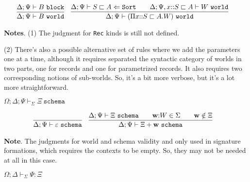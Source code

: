 \documentclass[letterpaper, 11pt]{article}
\newcommand{\Lar}{\Leftarrow}
\newcommand{\Rec}{\texttt{Rec}}
\newcommand{\Sort}{\texttt{Sort}}
\newcommand{\block}{\texttt{block}}
\newcommand{\world}{\texttt{world}}
\newcommand{\schema}{\texttt{schema}}
\begin{document}
    \begin{align*}
      & \infer{\Delta; \Psi \vdash B \ \world}{\Delta; \Psi \vdash B \ \block} &
      & \infer{\Delta; \Psi \vdash (\Pi x{::}S \sqsubset A. W) \ \world}
              {
                \Delta; \Psi \vdash S \sqsubset A \Lar \Sort
                &&
                \Delta; \Psi, x{::} S \sqsubset A \vdash W \ \world
              }
    \end{align*}

    

    \textbf{Notes}. (1) The judgment for \texttt{Rec} kinds is still not defined.
    
    (2) There's also a possible alternative set of rules where we add the parameters one at a time, although it requires separated the syntactic
    category of worlds in two parts, one for records and one for parametrized records.  It also requires two corresponding notions of sub-worlds.
    So, it's a bit more verbose, but it's a lot more straightforward.

    $\boxed{\Omega; \Delta; \Psi \vdash_\Sigma \Xi \ \schema}$

    \begin{align*}
      & \infer{\Delta; \Psi \vdash \varepsilon \ \schema}{} &
      & \infer{\Delta; \Psi \vdash \Xi + \textbf{w} \ \schema}
        {
          \Delta; \Psi \vdash \Xi \ \schema
          &&
          \textbf{w} {:} W \in \Sigma
          &&
          \textbf{w} \notin \Xi
        }
    \end{align*}
    
    \textbf{Note}.  The judgments for world and schema validity and only used in signature formations, which requires the contexts to be empty.
    So, they may not be needed at all in this case.

    $\boxed{\Omega; \Delta \vdash_\Sigma \Psi : \Xi}$
    
\end{document}
